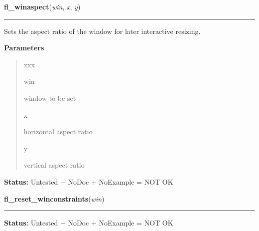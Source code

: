 \hspace{.8\funcindent}\begin{boxedminipage}{\funcwidth}

    \raggedright \textbf{fl\_winaspect}(\textit{win}, \textit{x}, \textit{y})

    \vspace{-1.5ex}

    \rule{\textwidth}{0.5\fboxrule}
\setlength{\parskip}{2ex}
    Sets the aspect ratio of the window for later interactive resizing.

\setlength{\parskip}{1ex}
      \textbf{Parameters}
      \vspace{-1ex}

      \begin{quote}
        \begin{Ventry}{xxx}

          \item[win]

          window to be set

          \item[x]

          horizontal aspect ratio

          \item[y]

          vertical aspect ratio

        \end{Ventry}

      \end{quote}

\textbf{Status:} Untested + NoDoc + NoExample = NOT OK



    \end{boxedminipage}

    \label{xformslib:library:fl_reset_winconstraints}

    \vspace{0.5ex}

\hspace{.8\funcindent}\begin{boxedminipage}{\funcwidth}

    \raggedright \textbf{fl\_reset\_winconstraints}(\textit{win})

    \vspace{-1.5ex}

    \rule{\textwidth}{0.5\fboxrule}
\setlength{\parskip}{2ex}
\setlength{\parskip}{1ex}
\textbf{Status:} Untested + NoDoc + NoExample = NOT OK



    \end{boxedminipage}

